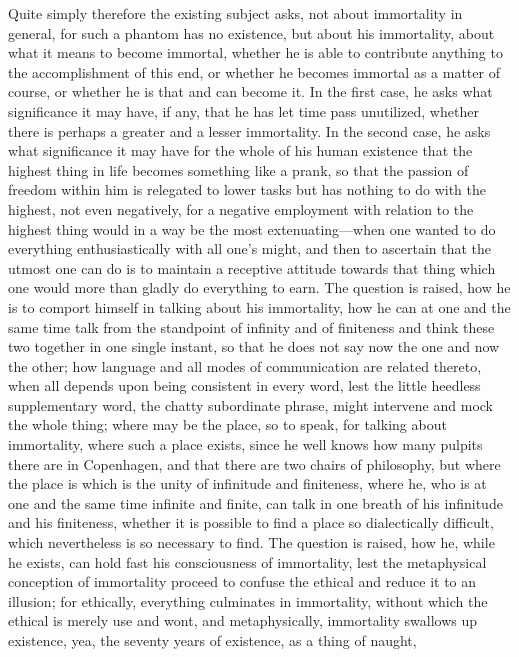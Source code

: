 \documentclass[12pt]{article}
\begin{document}
Quite simply therefore the existing subject asks, not about immortality
in general, for such a phantom has no existence, but about his
immortality, about what it means to become immortal, whether he is
able to contribute anything to the accomplishment of this end, or
whether he becomes immortal as a matter of course, or whether he is
that and can become it. In the first case, he asks what significance
it may have, if any, that he has let time pass unutilized, whether
there is perhaps a greater and a lesser immortality. In the second
case, he asks what significance it may have for the whole of his human
existence that the highest thing in life becomes something like a
prank, so that the passion of freedom within him is relegated to lower
tasks but has nothing to do with the highest, not even negatively, for
a negative employment with relation to the highest thing would in a
way be the most extenuating---when one wanted to do everything
enthusiastically with all one's might, and then to ascertain that the
utmost one can do is to maintain a receptive attitude towards that
thing which one would more than gladly do everything to earn. The
question is raised, how he is to comport himself in talking about his
immortality, how he can at one and the same time talk from the
standpoint of infinity and of finiteness and think these two together
in one single instant, so that he does not say now the one and now the
other; how language and all modes of communication are related thereto,
when all depends upon being consistent in every word, lest the little
heedless supplementary word, the chatty subordinate phrase, might
intervene and mock the whole thing; where may be the place, so to
speak, for talking about immortality, where such a place exists, since
he well knows how many pulpits there are in Copenhagen, and that there
are two chairs of philosophy, but where the place is which is the unity
of infinitude and finiteness, where he, who is at one and the same time
infinite and finite, can talk in one breath of his infinitude and his
finiteness, whether it is possible to find a place so dialectically
difficult, which nevertheless is so necessary to find. The question is
raised, how he, while he exists, can hold fast his consciousness of
immortality, lest the metaphysical conception of immortality proceed to
confuse the ethical and reduce it to an illusion; for ethically,
everything culminates in immortality, without which the ethical is
merely use and wont, and metaphysically, immortality swallows up
existence, yea, the seventy years of existence, as a thing of naught,
\end{document}
